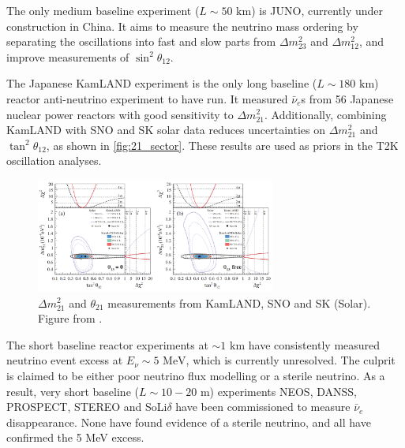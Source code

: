 The only medium baseline experiment ($L\sim50\text{ km}$) is JUNO\cite{juno}, currently under construction in China. It aims to measure the neutrino mass ordering by separating the oscillations into fast and slow parts from $\Delta m^2_{23}$ and $\Delta m^2_{12}$, and improve measurements of $\sin^2 \theta_{12}$.

The Japanese KamLAND experiment is the only long baseline ($L\sim180\text{ km}$) reactor anti-neutrino experiment to have run. It measured $\bar{\nu}_e$s from 56 Japanese nuclear power reactors with good sensitivity to $\Delta m^2_{21}$. Additionally, combining KamLAND with SNO and SK solar data reduces uncertainties on $\Delta m^2_{21}$ and $\tan^2\theta_{12}$, as shown in \autoref{fig:21_sector}. These results are used as priors in the T2K oscillation analyses.
\begin{figure}[h]
	\includegraphics[width=0.7\textwidth, trim={0mm 0mm 0mm 0mm}, clip,page=1]{figures/theory/kamland_solar_comb}
	\caption{$\Delta m^2_{21}$ and $\theta_{21}$ measurements from KamLAND, SNO and SK (Solar). Figure from \cite{kamland_2011}.}
	\label{fig:21_sector}
\end{figure}

The short baseline reactor experiments at $\sim1\text{ km}$ have consistently measured neutrino event excess at $E_\nu\sim5\text{ MeV}$\cite{double_chooz, daya_bay, reno}, which is currently unresolved. The culprit is claimed to be either poor neutrino flux modelling or a sterile neutrino\cite{huber_neos,steriles}. As a result, very short baseline ($L\sim10-20\text{ m}$) experiments NEOS\cite{neos}, DANSS\cite{danss}, PROSPECT\cite{prospect}, STEREO\cite{stereo} and SoLi$\delta$\cite{solid} have been commissioned to measure $\bar{\nu}_e$ disappearance. None have found evidence of a sterile neutrino, and all have confirmed the 5 MeV excess.
